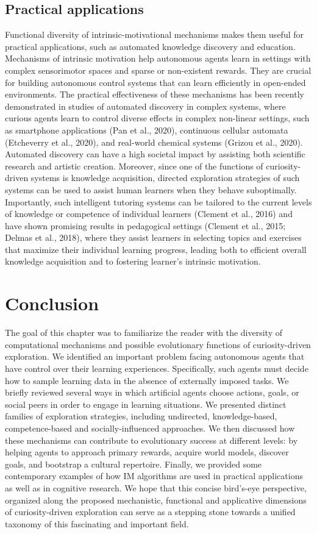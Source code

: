 \subsection{Practical applications} 
Functional diversity of intrinsic-motivational mechanisms makes them useful for practical applications, such as automated knowledge discovery and education. Mechanisms of intrinsic motivation help autonomous agents learn in settings with complex sensorimotor spaces and sparse or non-existent rewards. They are crucial for building autonomous control systems that can learn efficiently in open-ended environments. The practical effectiveness of these mechanisms has been recently demonstrated in studies of automated discovery in complex systems, where curious agents learn to control diverse effects in complex non-linear settings, such as smartphone applications (Pan et al., 2020), continuous cellular automata (Etcheverry et al., 2020), and real-world chemical systems (Grizou et al., 2020). Automated discovery can have a high societal impact by assisting both scientific research and artistic creation. Moreover, since one of the functions of curiosity-driven systems is knowledge acquisition, directed exploration strategies of such systems can be used to assist human learners when they behave suboptimally. Importantly, such intelligent tutoring systems can be tailored to the current levels of knowledge or competence of individual learners (Clement et al., 2016) and have shown promising results in pedagogical settings (Clement et al., 2015; Delmas et al., 2018), where they assist learners in selecting topics and exercises that maximize their individual learning progress, leading both to efficient overall knowledge acquisition and to fostering learner's intrinsic motivation.
    
\section{Conclusion}
The goal of this chapter was to familiarize the reader with the diversity of computational mechanisms and possible evolutionary functions of curiosity-driven exploration. We identified an important problem facing autonomous agents that have control over their learning experiences. Specifically, such agents must decide how to sample learning data in the absence of externally imposed tasks. We briefly reviewed several ways in which artificial agents choose actions, goals, or social peers in order to engage in learning situations. We presented distinct families of exploration strategies, including undirected, knowledge-based, competence-based and socially-influenced approaches. We then discussed how these mechanisms can contribute to evolutionary success at different levels: by helping agents to approach primary rewards, acquire world models, discover goals, and bootstrap a cultural repertoire. Finally, we provided some contemporary examples of how IM algorithms are used in practical applications as well as in cognitive research. We hope that this concise bird’s-eye perspective, organized along the proposed mechanistic, functional and applicative dimensions of curiosity-driven exploration can serve as a stepping stone towards a unified taxonomy of this fascinating and important field.